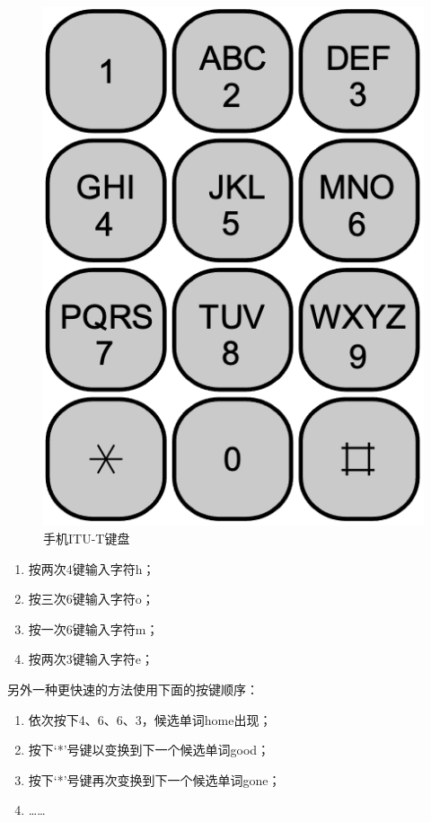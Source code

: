 \documentclass[b5paper]{ctexart}
\begin{document}
\begin{figure}[htbp]
  \centering
  \includegraphics[scale=0.4]{img/itu-t.png}
  \caption{手机ITU-T键盘}
  \label{fig:itut-keypad}
\end{figure}

\begin{enumerate}
\item 按两次4键输入字符h；
\item 按三次6键输入字符o；
\item 按一次6键输入字符m；
\item 按两次3键输入字符e；
\end{enumerate}

另外一种更快速的方法使用下面的按键顺序：

\begin{enumerate}
\item 依次按下4、6、6、3，候选单词home出现；
\item 按下‘*’号键以变换到下一个候选单词good；
\item 按下‘*’号键再次变换到下一个候选单词gone；
\item ……
\end{enumerate}
\end{document}
